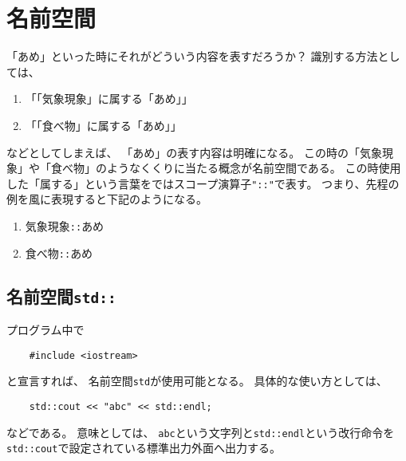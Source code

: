  \section{名前空間\label{sec:namespace}}


 「あめ」といった時にそれがどういう内容を表すだろうか？
 識別する方法としては、
 \begin{enumerate}
  \item 「「気象現象」に属する「あめ」」
  \item「「食べ物」に属する「あめ」」
 \end{enumerate}
 などとしてしまえば、
 「あめ」の表す内容は明確になる。
 この時の「気象現象」や「食べ物」のようなくくりに当たる概念が名前空間である。
 この時使用した「属する」という言葉を\Cpp ではスコープ演算子\verb|"::"|で表す。
 つまり、先程の例を\Cpp 風に表現すると下記のようになる。
 \begin{enumerate}
  \item 気象現象\verb|::|あめ
  \item 食べ物\verb|::|あめ
 \end{enumerate}

  \subsection{名前空間\texttt{std::}}
  プログラム中で
\begin{verbatim}
	#include <iostream>
\end{verbatim}
と宣言すれば、
名前空間\texttt{std}が使用可能となる。
具体的な使い方としては、
\begin{verbatim}
	std::cout << "abc" << std::endl;
\end{verbatim}
などである。
意味としては、
\verb|abc|という文字列と\verb|std::endl|という改行命令を\verb|std::cout|で設定されている標準出力外面へ出力する。


